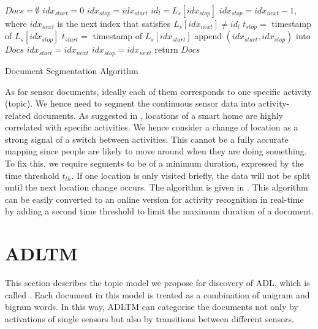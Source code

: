\documentclass{article}
\begin{document}
\begin{algorithm}[!b]

    $Docs=\emptyset$\;
    $idx_{start} = 0$\;
    $idx_{stop} = idx_{start}$\;
      {
        $id_l = L_s[idx_{stop}]$ \;
        $idx_{stop} = idx_{next}-1$, where $idx_{next}$ is the next index that satisfies $L_s[idx_{next}] \not=  id_{l}$\;
        $t_{stop} = $ timestamp of  $L_s[idx_{stop}]$\; 
        $t_{start} = $ timestamp of  $L_s[idx_{start}]$\;
        {
            append $(idx_{start}, idx_{stop})$ into $Docs$\;
            $idx_{start} = idx_{next}$\;
        }
        $idx_{stop} = idx_{next}$\;
      }
    return $Docs$\;
 \caption{Document Segmentation Algorithm}
 \label{alg:segmentation}
\end{algorithm}

As for sensor documents, ideally each of them corresponds to one specific activity (topic). We hence need to segment the continuous sensor data into activity-related documents. 
%
As suggested in \cite{hong2013segmenting}, locations of a smart home are highly correlated with specific activities. We hence consider a change of location as a strong signal of a switch between activities. This cannot be a fully accurate mapping since people are likely to move around when they are doing something.  To fix this, we require segments to be of a minimum duration, expressed by the time threshold $t_{th}$. If one location is only visited briefly, the data will not be split until the next location change occurs. 
The algorithm is given in . 
This algorithm can be easily converted to an online version for activity recognition in real-time by adding a second time threshold to limit the maximum duration of a document. 
 
%
\section{\acl{ADLTM}}
\label{sec:adl_tm}
This section describes the topic model we propose for discovery of \acl{ADL},  which is called . Each document in this model is treated as a combination of unigram and bigram words. In this way, \ac{ADLTM} can categorise the documents not only by activations of single sensors but also by transitions between different sensors. 
\end{document}
